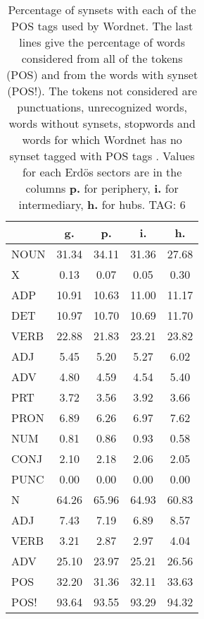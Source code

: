 \begin{table}[h!]
\begin{center}
\begin{tabular}{| l || c | c | c | c |}\hline
 & {\bf g.} & {\bf p.} & {\bf i.} & {\bf h.} \\\hline\hline
NOUN & 31.34  & 34.11  & 31.36  & 27.68 \\
X & 0.13  & 0.07  & 0.05  & 0.30 \\\hline
ADP & 10.91  & 10.63  & 11.00  & 11.17 \\
DET & 10.97  & 10.70  & 10.69  & 11.70 \\\hline
VERB & 22.88  & 21.83  & 23.21  & 23.82 \\\hline
ADJ & 5.45  & 5.20  & 5.27  & 6.02 \\
ADV & 4.80  & 4.59  & 4.54  & 5.40 \\\hline
PRT & 3.72  & 3.56  & 3.92  & 3.66 \\
PRON & 6.89  & 6.26  & 6.97  & 7.62 \\
NUM & 0.81  & 0.86  & 0.93  & 0.58 \\
CONJ & 2.10  & 2.18  & 2.06  & 2.05 \\
PUNC & 0.00  & 0.00  & 0.00  & 0.00 \\\hline\hline\hline
N & 64.26  & 65.96  & 64.93  & 60.83 \\\hline
ADJ & 7.43  & 7.19  & 6.89  & 8.57 \\\hline
VERB & 3.21  & 2.87  & 2.97  & 4.04 \\\hline
ADV & 25.10  & 23.97  & 25.21  & 26.56 \\\hline\hline
POS & 32.20  & 31.36  & 32.11  & 33.63 \\\hline
POS! & 93.64  & 93.55  & 93.29  & 94.32 \\\hline
\end{tabular}
\caption{Percentage of synsets with each of the POS tags used by Wordnet. The last lines give the percentage of words considered from all of the tokens (POS) and from the words with synset (POS!). The tokens not considered are punctuations, unrecognized words, words without synsets, stopwords and words for which Wordnet has no synset  tagged with POS tags . Values for each Erd\"os sectors are in the columns {{\bf p.}} for periphery, {{\bf i.}} for intermediary, {{\bf h.}} for hubs. TAG: 6}
\end{center}
\end{table}